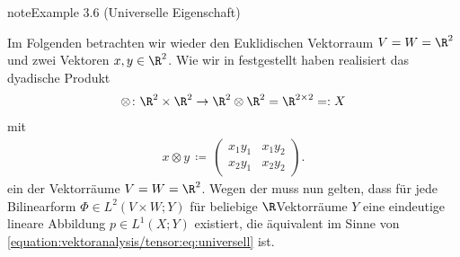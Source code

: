 \documentclass[letterpaper,10pt,english]{jupyterBook}
\begin{document}
\begin{sphinxadmonition}{note}{Example 3.6 (Universelle Eigenschaft)}



\sphinxAtStartPar
Im Folgenden betrachten wir wieder den Euklidischen Vektorraum \(V=W=\R^2\) und zwei Vektoren \(x, y \in \R^2\).
Wie wir in {\hyperref[\detokenize{vektoranalysis/tensor:ex:tensorproduktVarianten}]{}} festgestellt haben realisiert das dyadische Produkt
\begin{equation*}
\begin{split}\otimes \colon \R^2 \times \R^2 \rightarrow \R^2 \otimes \R^2 = \R^{2 \times 2} =: X\end{split}
\end{equation*}
\sphinxAtStartPar
mit
\begin{equation*}
\begin{split}x \otimes y \, \coloneqq \,
\begin{pmatrix}
x_1y_1 & x_1y_2 \\
x_2y_1 & x_2y_2
\end{pmatrix}.\end{split}
\end{equation*}
\sphinxAtStartPar
ein  der Vektorräume \(V=W=\R^2\).
Wegen der  muss nun gelten, dass für jede Bilinearform \(\Phi \in L^2(V \times W; Y)\) für beliebige \(\R\)\sphinxhyphen{}Vektorräume \(Y\) eine eindeutige lineare Abbildung \(p \in L^1(X; Y)\) existiert, die äquivalent im Sinne von \eqref{equation:vektoranalysis/tensor:eq:universell} ist.


\end{sphinxadmonition}
\end{document}
